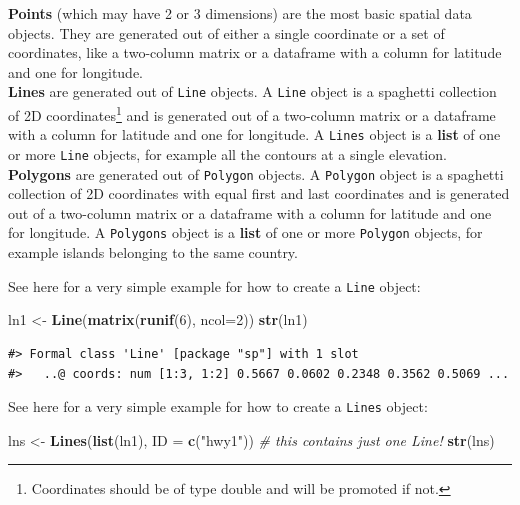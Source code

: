 \documentclass[]{book}
\newenvironment{Shaded}{\begin{snugshade}}{\end{snugshade}}
\newcommand{\KeywordTok}[1]{\textcolor[rgb]{0.13,0.29,0.53}{\textbf{#1}}}
\newcommand{\DataTypeTok}[1]{\textcolor[rgb]{0.13,0.29,0.53}{#1}}
\newcommand{\DecValTok}[1]{\textcolor[rgb]{0.00,0.00,0.81}{#1}}
\newcommand{\StringTok}[1]{\textcolor[rgb]{0.31,0.60,0.02}{#1}}
\newcommand{\CommentTok}[1]{\textcolor[rgb]{0.56,0.35,0.01}{\textit{#1}}}
\newcommand{\NormalTok}[1]{#1}
\let\rmarkdownfootnote\footnote%
\def\footnote{\protect\rmarkdownfootnote}
\theoremstyle{definition}
\theoremstyle{definition}
\theoremstyle{definition}
\theoremstyle{remark}
\begin{document}
\textbf{Points} (which may have 2 or 3 dimensions) are the most basic
spatial data objects. They are generated out of either a single
coordinate or a set of coordinates, like a two-column matrix or a
dataframe with a column for latitude and one for longitude.\\
\textbf{Lines} are generated out of \texttt{Line} objects. A
\texttt{Line} object is a spaghetti collection of 2D
coordinates\footnote{Coordinates should be of type double and will be
  promoted if not.} and is generated out of a two-column matrix or a
dataframe with a column for latitude and one for longitude. A
\texttt{Lines} object is a \textbf{list} of one or more \texttt{Line}
objects, for example all the contours at a single elevation.\\
\textbf{Polygons} are generated out of \texttt{Polygon} objects. A
\texttt{Polygon} object is a spaghetti collection of 2D coordinates with
equal first and last coordinates and is generated out of a two-column
matrix or a dataframe with a column for latitude and one for longitude.
A \texttt{Polygons} object is a \textbf{list} of one or more
\texttt{Polygon} objects, for example islands belonging to the same
country.

See here for a very simple example for how to create a \texttt{Line}
object:

\begin{Shaded}
\begin{Highlighting}[]
\NormalTok{ln1 <-}\StringTok{ }\KeywordTok{Line}\NormalTok{(}\KeywordTok{matrix}\NormalTok{(}\KeywordTok{runif}\NormalTok{(}\DecValTok{6}\NormalTok{), }\DataTypeTok{ncol=}\DecValTok{2}\NormalTok{))}
\KeywordTok{str}\NormalTok{(ln1)}
\end{Highlighting}
\end{Shaded}

\begin{verbatim}
#> Formal class 'Line' [package "sp"] with 1 slot
#>   ..@ coords: num [1:3, 1:2] 0.5667 0.0602 0.2348 0.3562 0.5069 ...
\end{verbatim}

See here for a very simple example for how to create a \texttt{Lines}
object:

\begin{Shaded}
\begin{Highlighting}[]
\NormalTok{lns <-}\StringTok{ }\KeywordTok{Lines}\NormalTok{(}\KeywordTok{list}\NormalTok{(ln1), }\DataTypeTok{ID =} \KeywordTok{c}\NormalTok{(}\StringTok{"hwy1"}\NormalTok{)) }\CommentTok{# this contains just one Line!}
\KeywordTok{str}\NormalTok{(lns)}
\end{Highlighting}
\end{Shaded}
\end{document}
